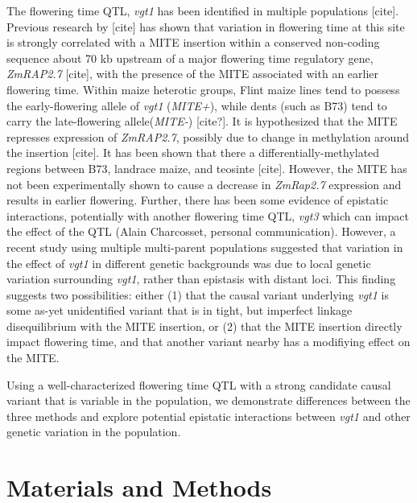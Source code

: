 \documentclass[article,9pt,twocolumn,twoside]{rilabRxiv}
\begin{document}
The flowering time QTL, \emph{vgt1} has been identified in multiple populations [cite]. Previous research by [cite] has shown that variation in flowering time at this site is strongly correlated with a MITE insertion within a conserved non-coding sequence about 70 kb upstream of a major flowering time regulatory gene, \emph{ZmRAP2.7} [cite], with the presence of the MITE associated with an earlier flowering time. Within maize heterotic groups, Flint maize lines tend to possess the early-flowering allele of \emph{vgt1} (\emph{MITE+}), while dents (such as B73) tend to carry the late-flowering allele(\emph{MITE-}) [cite?]. It is hypothesized that the MITE represses expression of \emph{ZmRAP2.7}, possibly due to change in methylation around the insertion [cite]. It has been shown that there a differentially-methylated regions between B73, landrace maize, and teosinte [cite]. However, the MITE has not been experimentally shown to cause a decrease in \emph{ZmRap2.7} expression and results in earlier flowering. Further, there has been some evidence of epistatic interactions, potentially with another flowering time QTL, \emph{vgt3} which can impact the effect of the QTL (Alain Charcosset, personal communication). However, a recent study using multiple multi-parent populations suggested that variation in the effect of \emph{vgt1} in different genetic backgrounds was due to local genetic variation surrounding \emph{vgt1}, rather than epistasis with distant loci. This finding suggests two possibilities: either (1) that the causal variant underlying \emph{vgt1} is some as-yet unidentified variant that is in tight, but imperfect linkage disequilibrium with the MITE insertion, or (2) that the MITE insertion directly impact flowering time, and that another variant nearby has a modifiying effect on the MITE.

Using a well-characterized flowering time QTL with a strong candidate causal variant that is variable in the population, we demonstrate differences between the three methods and explore potential epistatic interactions between \emph{vgt1} and other genetic variation in the population.
\section{Materials and Methods}
\label{sec:materials:methods}
\end{document}
